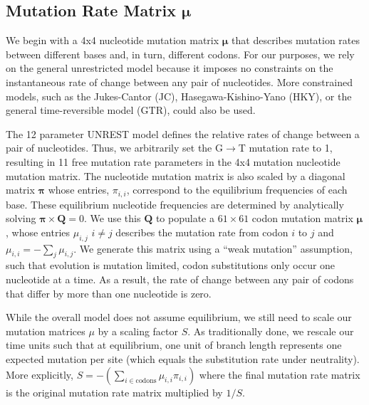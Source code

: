 \documentclass[onecolumn,letterpaper,fleqn,nogrid]{myMBE}%
\newcommand{\pimatrix}{\ensuremath{\boldsymbol{\pi}}\xspace}
\newcommand{\mumatrix}{\ensuremath{\boldsymbol{\mu}}\xspace}
\newcommand{\Qmatrix}{\ensuremath{\mathbf{Q}}\xspace}
\newcommand{\muij}{\ensuremath{\mu_{i,j}}\xspace}
\begin{document}
\subsection{Mutation Rate Matrix \mumatrix}
We begin with a 4x4 nucleotide mutation matrix \mumatrix that describes mutation rates between different bases and, in turn, different codons.
For our purposes, we rely on the general unrestricted model \citep[UNREST from ][]{Yang1994} because it imposes no constraints on the instantaneous rate of change between any pair of nucleotides.
More constrained models, such as the Jukes-Cantor (JC), Hasegawa-Kishino-Yano (HKY), or the general time-reversible model (GTR), could also be used.

The 12 parameter UNREST model defines the relative rates of change between a pair of nucleotides.
Thus, we arbitrarily set the G$\rightarrow$T mutation rate to 1, resulting in 11 free mutation rate parameters in the 4x4 mutation nucleotide mutation matrix.
The nucleotide mutation matrix is also scaled by a diagonal matrix \pimatrix whose entries, $\pi_{i,i}$, correspond to the equilibrium frequencies of each base.
These equilibrium nucleotide frequencies are determined by analytically solving $\pimatrix \times \Qmatrix = 0$.
We use this \Qmatrix to populate a $61 \times 61$ codon mutation matrix $\mumatrix$, whose entries $\muij$ $i\neq j$ describes the mutation rate from codon $i$ to $j$ and $\mu_{i,i} = - \sum_j \mu_{i,j}$.
We generate this matrix using a ``weak mutation'' assumption, such that evolution is mutation limited, codon substitutions only occur one nucleotide at a time.
As a result, the rate of change between any pair of codons that differ by more than one nucleotide is zero.

While the overall model does not assume equilibrium, we still need to scale our mutation matrices $\mu$ by a scaling factor $S$.
As traditionally done, we rescale our time units such that at equilibrium, one unit of branch length represents one expected mutation per site (which equals the substitution rate under neutrality).
More explicitly, $ S = -\left(\sum_{i \in \text{codons}} \mu_{i,i} \pi_{i,i}\right)$ where the final mutation rate matrix is the original mutation rate matrix multiplied by $1/S$.
\end{document}
